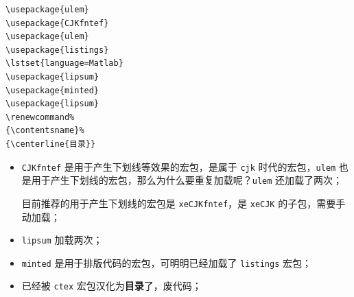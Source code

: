 \documentclass[aspectratio=169,fontset=none]{ctexbeamer}
\renewcommand{\emph}[1]{{\color{red}\bfseries #1}}
\newcommand{\pkg}[1]{\texttt{#1}}
\begin{document}
  \begin{frame}[fragile]
    \begin{minipage}[t]{0.45\textwidth}
      \begin{verbatim}
\usepackage{ulem}
\usepackage{CJKfntef}
\usepackage{ulem}
\usepackage{listings}
\lstset{language=Matlab}
\usepackage{lipsum}
\usepackage{minted}
\usepackage{lipsum}
\renewcommand%
{\contentsname}%
{\centerline{目录}}
      \end{verbatim}
    \end{minipage}%
    \begin{minipage}[t]{0.55\textwidth}
      \begin{itemize}
        \item \pkg{CJKfntef} 是用于产生下划线等效果的宏包，是属于 \pkg{cjk} 时代的宏包，\pkg{ulem} 也是用于产生下划线的宏包，那么为什么要重复加载呢？\pkg{ulem} 还加载了两次；
        
        目前推荐的用于产生下划线的宏包是 \pkg{xeCJKfntef}，是 \pkg{xeCJK} 的子包，需要手动加载；
        \item \pkg{lipsum} 加载两次；
        \item \pkg{minted} 是用于排版代码的宏包，可明明已经加载了 \pkg{listings} 宏包；
        \item \texttt{\contentsname} 已经被 \pkg{ctex} 宏包汉化为\emph{目录}了，废代码；
      \end{itemize}
    \end{minipage}
  \end{frame}
\end{document}
